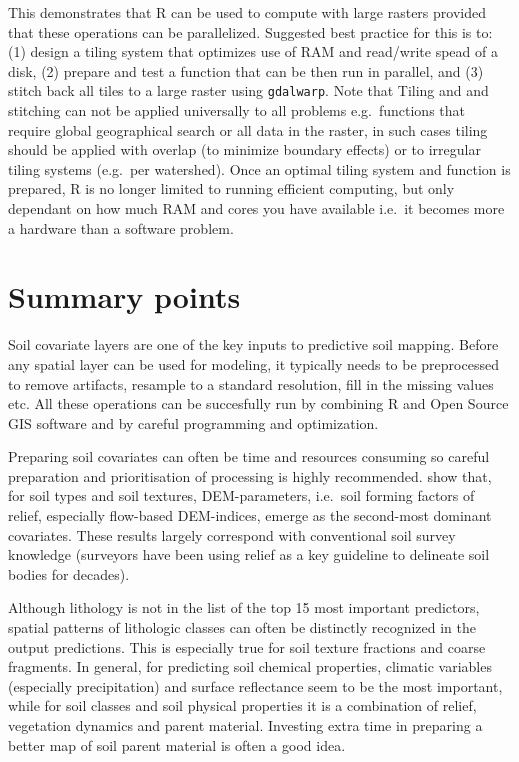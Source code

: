\documentclass[11pt]{krantz}
\theoremstyle{definition}
\theoremstyle{definition}
\theoremstyle{definition}
\theoremstyle{remark}
\begin{document}
This demonstrates that R can be used to compute with large rasters
provided that these operations can be parallelized. Suggested best
practice for this is to: (1) design a tiling system that optimizes use
of RAM and read/write spead of a disk, (2) prepare and test a function
that can be then run in parallel, and (3) stitch back all tiles to a
large raster using \texttt{gdalwarp}. Note that Tiling and and stitching
can not be applied universally to all problems e.g.~functions that
require global geographical search or all data in the raster, in such
cases tiling should be applied with overlap (to minimize boundary
effects) or to irregular tiling systems (e.g.~per watershed). Once an
optimal tiling system and function is prepared, R is no longer limited
to running efficient computing, but only dependant on how much RAM and
cores you have available i.e.~it becomes more a hardware than a software
problem.

\hypertarget{summary-points-1}{%
\section{Summary points}\label{summary-points-1}}

Soil covariate layers are one of the key inputs to predictive soil
mapping. Before any spatial layer can be used for modeling, it typically
needs to be preprocessed to remove artifacts, resample to a standard
resolution, fill in the missing values etc. All these operations can be
succesfully run by combining R and Open Source GIS software and by
careful programming and optimization.

Preparing soil covariates can often be time and resources consuming so
careful preparation and prioritisation of processing is highly
recommended. \citet{Hengl2017SoilGrids250m} show that, for soil types
and soil textures, DEM-parameters, i.e.~soil forming factors of relief,
especially flow-based DEM-indices, emerge as the second-most dominant
covariates. These results largely correspond with conventional soil
survey knowledge (surveyors have been using relief as a key guideline to
delineate soil bodies for decades).

Although lithology is not in the list of the top 15 most important
predictors, spatial patterns of lithologic classes can often be
distinctly recognized in the output predictions. This is especially true
for soil texture fractions and coarse fragments. In general, for
predicting soil chemical properties, climatic variables (especially
precipitation) and surface reflectance seem to be the most important,
while for soil classes and soil physical properties it is a combination
of relief, vegetation dynamics and parent material. Investing extra time
in preparing a better map of soil parent material is often a good idea.
\end{document}
